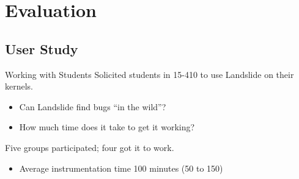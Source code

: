 \documentclass[xcolor=dvipsnames]{beamer}
\begin{document}
\section{Evaluation}

%
%
%

\subsection{User Study}

\begin{frame}{Working with Students} %
	Solicited students in 15-410 to use Landslide on their kernels.
	\begin{itemize}
		\item Can Landslide find bugs ``in the wild''?
		\item How much time does it take to get it working?
	\end{itemize}
	\linegap

	Five groups participated; four got it to work.
	\begin{itemize}
		\item Average instrumentation time 100 minutes (50 to 150)
	\end{itemize}
\end{frame}
\end{document}
